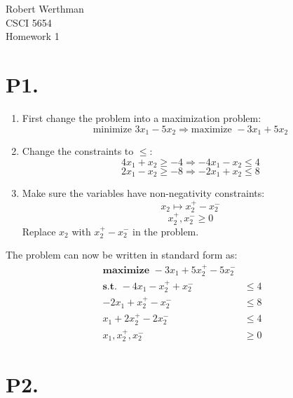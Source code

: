 \documentclass[12pt]{article}
\begin{document}
\noindent
Robert Werthman\\
CSCI 5654\\
Homework 1\\

\section*{P1.}
\begin{enumerate}
  \item First change the problem into a maximization problem:
        $$
          \text{minimize } 3x_{1} - 5x_{2} \Rightarrow 
          \text{maximize } -3x_{1} + 5x_{2}
        $$
  \item Change the constraints to $\leq$:
        $$4x_{1} + x_{2} \geq -4 \Rightarrow -4x_{1} - x_{2} \leq 4$$
        $$2x_{1} - x_{2} \geq -8 \Rightarrow -2x_{1} + x_{2} \leq 8$$
  \item Make sure the variables have non-negativity constraints:
        $$x_{2} \mapsto x^{+}_{2} - x^{-}_{2}$$
        $$x^{+}_{2}, x^{-}_{2} \geq 0$$
        Replace $x_{2}$ with $x^{+}_{2} - x^{-}_{2}$ in the problem.
\end{enumerate}
The problem can now be written in standard form as:
\begin{align*}
  \textbf{maximize } -3x_{1} + 5x^{+}_{2} - 5x^{-}_{2} &\\
  \textbf{s.t. }     -4x_{1} - x^{+}_{2} + x^{-}_{2} &\leq 4\\
                     -2x_{1} + x^{+}_{2} - x^{-}_{2} &\leq 8\\
                     x_{1} + 2x^{+}_{2} - 2x^{-}_{2} &\leq 4\\
                     x_{1}, x^{+}_{2}, x^{-}_{2} &\geq 0
\end{align*}

\section*{P2.}
\end{document}
